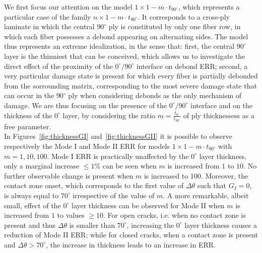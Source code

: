 \documentclass[review]{elsarticle}
\begin{document}
We first focus our attention on the model $1\times 1-m\cdot t_{90^{\circ}}$, which represents a particular case of the family $n\times 1-m\cdot t_{90^{\circ}}$. It corresponds to a cross-ply laminate in which the central $90^{\circ}$ ply is constituted by only one fiber row, in which each fiber possesses a debond appearing on alternating sides. The model thus represents an extreme idealization, in the sense that: first, the central $90^{\circ}$ layer is the thinniest that can be conceived, which allows us to investigate the direct effect of the proximity of the $0^{\circ}/90^{\circ}$ interface on debond ERR; second, a very particular damage state is present for which every fiber is partially debonded from the sorrounding matrix, corresponding to the most severe damage state that can occur in the $90^{\circ}$ ply when considering debonds as the only mechanism of damage. We are thus focusing on the presence of the $0^{\circ}/90^{\circ}$ interface and on the thickness of the $0^{\circ}$ layer, by considering the ratio $m=\frac{t_{0^{\circ}}}{t_{90^{\circ}}}$ of ply thicknessess as a free parameter.\\
In Figures~\ref{fig:thicknessGI} and~\ref{fig:thicknessGII} it is possible to observe respectively the Mode I and Mode II ERR for models $1\times 1-m\cdot t_{90^{\circ}}$ with $m=1,10,100$. Mode I ERR is practically unaffected by the $0^{\circ}$ layer thickness, only a marginal increase $\leq1\%$ can be seen when $m$ is increased from $1$ to $10$. No further observable change is present when $m$ is increased to $100$. Moreover, the contact zone onset, which corresponds to the first value of $\Delta\theta$ such that $G_{I}=0$, is always equal to $70^{\circ}$ irrespective of the value of $m$. A more remarkable, albeit small, effect of the $0^{\circ}$ layer thickness can be observed for Mode II when $m$ is increased from $1$ to values $\geq10$. For open cracks, i.e. when no contact zone is present and thus $\Delta\theta$ is smaller than $70^{\circ}$, increasing the $0^{\circ}$ layer thickness causes a reduction of Mode II ERR; while for closed cracks, when a contact zone is present and $\Delta\theta>70^{\circ}$, the increase in thickness leads to an increase in ERR.\\
\end{document}

